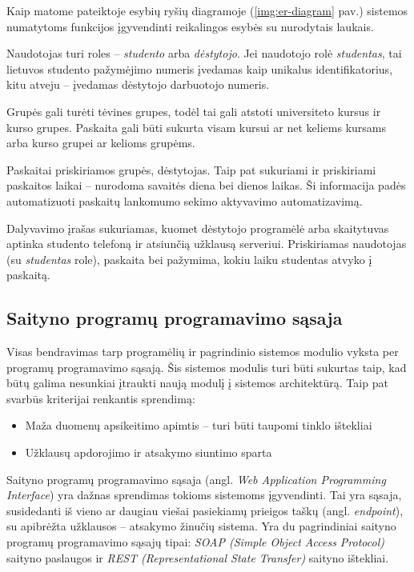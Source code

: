 \documentclass{VUMIFPSbakalaurinis}
\begin{document}
Kaip matome pateiktoje esybių ryšių diagramoje (\ref{img:er-diagram} pav.) sistemos numatytoms funkcijos įgyvendinti reikalingos esybės su nurodytais laukais.

Naudotojas turi roles – \textit{studento} arba \textit{dėstytojo}. Jei naudotojo rolė \textit{studentas}, tai lietuvos studento pažymėjimo numeris įvedamas kaip unikalus identifikatorius, kitu atveju – įvedamas dėstytojo darbuotojo numeris.

Grupės gali turėti tėvines grupes, todėl tai gali atstoti universiteto kursus ir kurso grupes. Paskaita gali būti sukurta visam kursui ar net keliems kursams arba kurso grupei ar kelioms grupėms.

Paskaitai priskiriamos grupės, dėstytojas. Taip pat sukuriami ir priskiriami paskaitos laikai – nurodoma savaitės diena bei dienos laikas. Ši informacija padės automatizuoti paskaitų lankomumo sekimo aktyvavimo automatizavimą.

Dalyvavimo įrašas sukuriamas, kuomet dėstytojo programėlė arba skaitytuvas aptinka studento telefoną ir atsiunčią užklausą serveriui. Priskiriamas naudotojas (su \textit{studentas} role), paskaita bei pažymima, kokiu laiku studentas atvyko į paskaitą.

\subsection{Saityno programų programavimo sąsaja} \label{webApi}

Visas bendravimas tarp programėlių ir pagrindinio sistemos modulio vyksta per programų programavimo sąsają. Šis sistemos modulis turi būti sukurtas taip, kad būtų galima nesunkiai įtraukti naują modulį į sistemos architektūrą. Taip pat svarbūs kriterijai renkantis sprendimą:

\begin{itemize}
	\item Maža duomenų apsikeitimo apimtis – turi būti taupomi tinklo ištekliai
	\item Užklausų apdorojimo ir atsakymo siuntimo sparta
\end{itemize}

Saityno programų programavimo sąsaja (angl. \textit{Web Application Programming Interface}) yra dažnas sprendimas tokioms sistemoms įgyvendinti. Tai yra sąsaja, susidedanti iš vieno ar daugiau viešai pasiekiamų prieigos taškų (angl. \textit{endpoint}), su apibrėžta užklausos – atsakymo žinučių sistema. Yra du pagrindiniai saityno programų programavimo sąsajų tipai: \textit{SOAP (Simple Object Access Protocol)} saityno paslaugos ir \textit{REST (Representational State Transfer)} saityno ištekliai.
\end{document}
